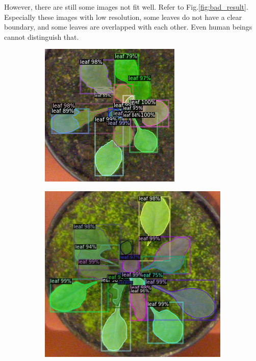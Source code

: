 \documentclass[conference]{IEEEtran}
\begin{document}
However, there are still some images not fit well. Refer to Fig.\ref{fig:bad_result}.
Especially these images with low resolution, some leaves do not have a clear boundary,
and some leaves are overlapped with each other. Even human beings cannot distinguish that.

\begin{figure}[h!]
\centering
\begin{subfigure}[h!]{0.24\textwidth}
    \centering
    \includegraphics[width=\textwidth]{img/ara2012_plant009.png}
\end{subfigure}
\hfill
\begin{subfigure}[h!]{0.24\textwidth}
    \centering
    \includegraphics[width=\textwidth]{img/ara2012_plant110.png}

\end{subfigure}
\end{figure}
\end{document}
